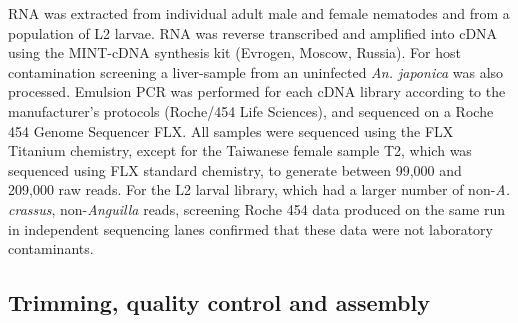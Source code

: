 RNA was extracted from individual adult male and female nematodes and
from a population of L2 larvae. RNA was reverse transcribed and
amplified into cDNA using the MINT-cDNA synthesis kit (Evrogen,
Moscow, Russia).  For host contamination screening a liver-sample from
an uninfected \textit{An. japonica} was also processed. Emulsion PCR
was performed for each cDNA library according to the manufacturer's
protocols (Roche/454 Life Sciences), and sequenced on a Roche 454
Genome Sequencer FLX. All samples were sequenced using the FLX
Titanium chemistry, except for the Taiwanese female sample T2, which
was sequenced using FLX standard chemistry, to generate between 99,000
and 209,000 raw reads. For the L2 larval library, which had a larger
number of non-\textit{A. crassus}, non-\textit{Anguilla} reads,
screening Roche 454 data produced on the same run in independent
sequencing lanes confirmed that these data were not laboratory
contaminants.

\subsection{Trimming, quality control and assembly}

